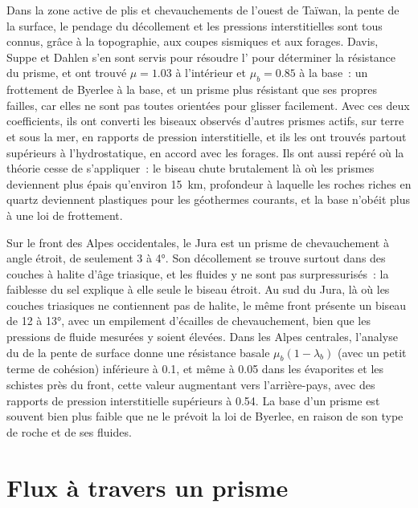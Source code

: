 Dans la zone active de plis et chevauchements de l'ouest de Taïwan, la pente de la surface, le
pendage du décollement et les pressions interstitielles sont tous connus, grâce à la topographie,
aux coupes sismiques et aux forages. Davis, Suppe et Dahlen s'en sont servis pour résoudre
l' pour déterminer la résistance du prisme, et ont trouvé $\mu = 1.03$
à l'intérieur et $\mu_b = 0.85$ à la base~: un frottement de Byerlee à la base, et un
prisme plus résistant que ses propres failles, car elles ne sont pas toutes orientées
pour glisser facilement. Avec ces deux coefficients, ils ont converti les biseaux observés
d'autres prismes actifs, sur terre et sous la mer, en rapports de pression interstitielle, et
ils les ont trouvés partout supérieurs à l'hydrostatique, en accord avec les forages. Ils ont aussi repéré
où la théorie cesse de s'appliquer~: le biseau chute brutalement là où les prismes
deviennent plus épais qu'environ \qty{15}{km}, profondeur à laquelle les roches riches en quartz
deviennent plastiques pour les géothermes courants, et la base n'obéit plus à une loi de frottement.

Sur le front des Alpes occidentales, le Jura est un prisme de chevauchement à angle
étroit, de seulement 3 à \ang{4}. Son décollement se trouve surtout dans des couches
à halite d'âge triasique, et les fluides y ne sont pas surpressurisés~: la faiblesse
du sel explique à elle seule le biseau étroit. Au sud du Jura, là où les couches
triasiques ne contiennent pas de halite, le même front présente un biseau de 12 à
\ang{13}, avec un empilement d'écailles de chevauchement, bien que les pressions de fluide
mesurées y soient élevées. Dans les Alpes centrales, l'analyse du  de la pente
de surface donne une résistance basale $\mu_b(1 - \lambda_b)$ (avec un petit terme de
cohésion) inférieure à 0.1, et même à 0.05 dans les évaporites et les schistes près du front,
cette valeur augmentant vers l'arrière-pays, avec des rapports de pression interstitielle
supérieurs à 0.54. La base d'un prisme est souvent bien plus faible que ne le prévoit la loi
de Byerlee, en raison de son type de roche et de ses fluides.

\section{Flux à travers un prisme}\label{sec:b3:orogenic-wedges:flux}

